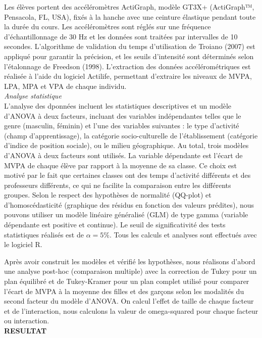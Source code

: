 \documentclass[12pt,a4paper]{article}
\begin{document}
	Les élèves portent des accéléromètres ActiGraph, modèle GT3X+ (ActiGraph™, Pensacola, FL, USA), fixés à la hanche avec une ceinture élastique pendant toute la durée du cours. Les accéléromètres sont réglés sur une fréquence d'échantillonnage de 30 Hz et les données sont traitées par intervalles de 10 secondes. L'algorithme de validation du temps d'utilisation de Troiano (2007) est appliqué pour garantir la précision, et les seuils d'intensité sont déterminés selon l'étalonnage de Freedson (1998). L'extraction des données accélérométriques est réalisée à l'aide du logiciel Actilife, permettant d'extraire les niveaux de MVPA, LPA, MPA et VPA de chaque individu.\\
	
	\textit{Analyse statistique}\\
	L'analyse des dponnées incluent les statistiques descriptives et un modèle d'ANOVA à deux facteurs, incluant des variables indépendantes telles que le genre (masculin, féminin) et l'une des variables suivantes : le type d'activité (champ d'apprentissage), la catégorie socio-culturelle de l'établissement (catégorie d'indice de position sociale), ou le milieu géographique. Au total, trois modèles d'ANOVA à deux facteurs sont utilisés. La variable dépendante est l'écart de MVPA de chaque élève par rapport à la moyenne de sa classe. Ce choix est motivé par le fait que certaines classes ont des temps d'activité différents et des professeurs différents, ce qui ne facilite la comparaison entre les différents groupes. Selon le respect des hypothèses de normalité (QQ-plot) et d'homoscédasticité (graphique des résidus en fonction des valeurs prédites), nous pouvons utiliser un modèle linéaire généralisé (GLM) de type gamma (variable dépendante est positive et continue). Le seuil de significativité des tests statistiques réalisés est de $\alpha = 5\%$. Tous les calculs et analyses sont effectués avec le logiciel R.
	
	Après avoir construit les modèles et vérifié les hypothèses, nous réalisons d'abord une analyse post-hoc (comparaison multiple) avec la correction de Tukey pour un plan équilibré et de Tukey-Kramer pour un plan complet utilisé pour comparer l'écart de MVPA à la moyenne des filles et des garçons selon les modalités du second facteur du modèle d'ANOVA. On calcul l'effet de taille de chaque facteur et de l'interaction, nous calculons la valeur de omega-squared pour chaque facteur ou interaction.\\
	
	\textbf{RESULTAT}
\end{document}
